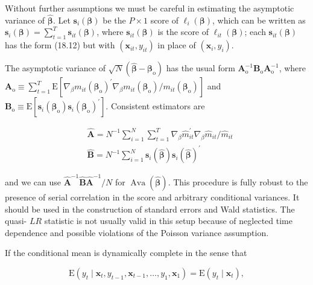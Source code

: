 \documentclass[10pt]{article}
\begin{document}
Without further assumptions we must be careful in estimating the asymptotic variance of $\hat{\boldsymbol{\beta}}$. Let $\mathbf{s}_{i}(\boldsymbol{\beta})$ be the $P \times 1$ score of $\ell_{i}(\boldsymbol{\beta})$, which can be written as $\mathbf{s}_{i}(\boldsymbol{\beta})= \sum_{t=1}^{T} \mathbf{s}_{i t}(\boldsymbol{\beta})$, where $\mathbf{s}_{i t}(\boldsymbol{\beta})$ is the score of $\ell_{i t}(\boldsymbol{\beta})$; each $\mathbf{s}_{i t}(\boldsymbol{\beta})$ has the form (18.12) but with $\left(\mathbf{x}_{i t}, y_{i t}\right)$ in place of $\left(\mathbf{x}_{i}, y_{i}\right)$.

The asymptotic variance of $\sqrt{N}\left(\hat{\boldsymbol{\beta}}-\boldsymbol{\beta}_{\mathrm{o}}\right)$ has the usual form $\mathbf{A}_{\mathrm{o}}^{-1} \mathbf{B}_{\mathrm{o}} \mathbf{A}_{\mathrm{o}}^{-1}$, where $\mathbf{A}_{\mathrm{o}} \equiv \sum_{t=1}^{T} \mathrm{E}\left[\nabla_{\beta} m_{i t}\left(\boldsymbol{\beta}_{\mathrm{o}}\right)^{\prime} \nabla_{\beta} m_{i t}\left(\boldsymbol{\beta}_{\mathrm{o}}\right) / m_{i t}\left(\boldsymbol{\beta}_{\mathrm{o}}\right)\right]$ and $\mathbf{B}_{\mathrm{o}} \equiv \mathrm{E}\left[\mathbf{s}_{i}\left(\boldsymbol{\beta}_{\mathrm{o}}\right) \mathbf{s}_{i}\left(\boldsymbol{\beta}_{\mathrm{o}}\right)^{\prime}\right]$. Consistent estimators are


\begin{align*}
& \hat{\mathbf{A}}=N^{-1} \sum_{i=1}^{N} \sum_{t=1}^{T} \nabla_{\beta} \hat{m}_{i t}^{\prime} \nabla_{\beta} \hat{m}_{i t} / \hat{m}_{i t}  \tag{18.70}\\
& \hat{\mathbf{B}}=N^{-1} \sum_{i=1}^{N} \mathbf{s}_{i}(\hat{\boldsymbol{\beta}}) \mathbf{s}_{i}(\hat{\boldsymbol{\beta}})^{\prime} \tag{18.71}
\end{align*}


and we can use $\hat{\mathbf{A}}^{-1} \hat{\mathbf{B}} \hat{\mathbf{A}}^{-1} / N$ for $\operatorname{Ava}(\hat{\boldsymbol{\beta}})$. This procedure is fully robust to the presence of serial correlation in the score and arbitrary conditional variances. It should be used in the construction of standard errors and Wald statistics. The quasi- $L R$ statistic is not usually valid in this setup because of neglected time dependence and possible violations of the Poisson variance assumption.

If the conditional mean is dynamically complete in the sense that


\begin{equation*}
\mathrm{E}\left(y_{t} \mid \mathbf{x}_{t}, y_{t-1}, \mathbf{x}_{t-1}, \ldots, y_{1}, \mathbf{x}_{1}\right)=\mathrm{E}\left(y_{t} \mid \mathbf{x}_{t}\right), \tag{18.72}
\end{equation*}
\end{document}
